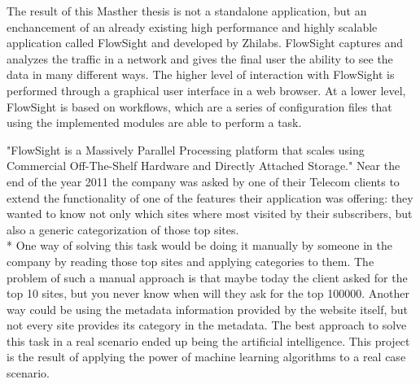 
The result of this Masther thesis is not a standalone application, but an enchancement of an already existing high performance and highly scalable application called FlowSight and developed by Zhilabs.
FlowSight captures and analyzes the traffic in a network and gives the final user the ability to see the data in many different ways. The higher level of interaction with FlowSight is performed through
a graphical user interface in a web browser. At a lower level, FlowSight is based on workflows, which are a series of configuration files that using the implemented modules are able to perform a task.



"FlowSight is a Massively Parallel Processing platform that scales using Commercial Off-The-Shelf Hardware and Directly Attached Storage."
Near the end of the year 2011 the company was asked by one of their Telecom clients to extend the functionality of one of the features their application was offering: they wanted to know not only which sites
where most visited by their subscribers, but also a generic categorization of those top sites. \\*
One way of solving this task would be doing it manually by someone in the company by reading those top sites and applying categories to them.
The problem of such a manual approach is that maybe today the client asked for the top 10 sites, but you never know when will they ask for the top 100000. 
Another way could be using the metadata information provided by the website itself, but not every site provides its category in the metadata.
The best approach to solve this task in a real scenario ended up being the artificial intelligence.
This project is the result of applying the power of machine learning algorithms to a real case scenario.

